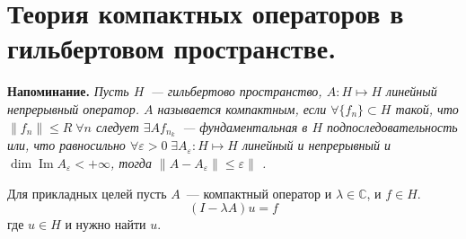 \documentclass[12pt]{article}
\renewcommand{\Im}{\operatorname{Im}}
\begin{document}
\newtheorem{Theor}{Теорема}
\newtheorem{Utv}{Утверждение}
\newtheorem{Opr}{Определение}
\newtheorem{Prim}{Пример}
\newtheorem{Upr}{Упражнение}
\newtheorem{Nabl}{Наблюдение}
\newtheorem{Zam}{Замечание}
\section*{Теория компактных операторов в гильбертовом пространстве.}
\textbf{Напоминание. }
{\sl
    Пусть  $H$~--- гильбертово пространство, $A : H \mapsto H$ линейный
    непрерывный оператор.
    $A$ называется компактным, если $\forall\{f_n\} \subset H$ такой, что
    $\|f_n\|\le R\;\forall n$ следует $\exists A f_{n_k}$~--- фундаментальная
    в $H$ подпоследовательность или, что равносильно $\forall \varepsilon > 0
    \;\exists A_\varepsilon : H \mapsto H$ линейный и непрерывный и $\dim \Im
    A_\varepsilon < + \infty$, тогда $\|A - A_\varepsilon\| \le \varepsilon\|$
    .
}

Для прикладных целей пусть $A$~--- компактный оператор и $\lambda \in
\mathbb C$, и $f \in H$.
$$
(I - \lambda A)u = f
$$
где $u \in H$ и нужно найти $u$.
\end{document}
